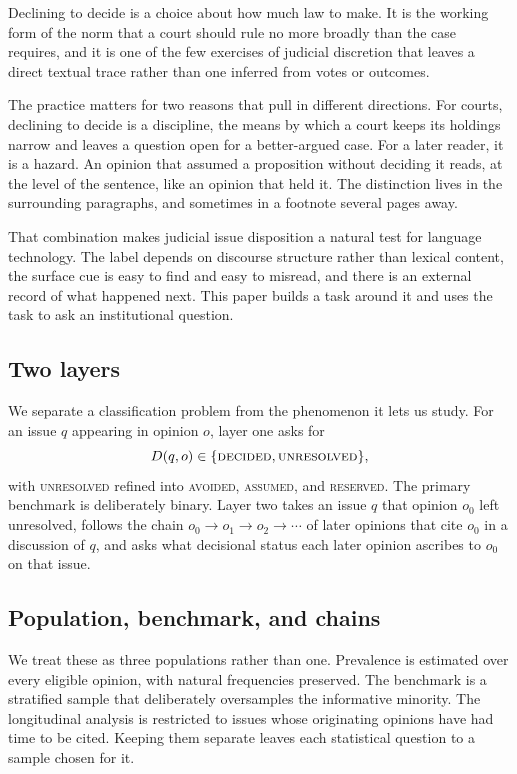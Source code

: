 \documentclass[11pt]{article}
\begin{document}
Declining to decide is a choice about how much law to make. It is the working
form of the norm that a court should rule no more broadly than the case
requires, and it is one of the few exercises of judicial discretion that leaves
a direct textual trace rather than one inferred from votes or outcomes.

The practice matters for two reasons that pull in different directions. For
courts, declining to decide is a discipline, the means by which a court keeps its
holdings narrow and leaves a question open for a better-argued case. For a later
reader, it is a hazard. An opinion that assumed a proposition without deciding it
reads, at the level of the sentence, like an opinion that held it. The
distinction lives in the surrounding paragraphs, and sometimes in a footnote
several pages away.

That combination makes judicial issue disposition a natural test for language
technology. The label depends on discourse structure rather than lexical content,
the surface cue is easy to find and easy to misread, and there is an external
record of what happened next. This paper builds a task around it and uses the
task to ask an institutional question.

\subsection{Two layers} We separate a classification problem from the phenomenon
it lets us study. For an issue $q$ appearing in opinion $o$, layer one asks for
\begin{equation}
D(q,o) \in \{\textsc{decided}, \textsc{unresolved}\},
\end{equation}
with \textsc{unresolved} refined into \textsc{avoided}, \textsc{assumed}, and
\textsc{reserved}. The primary benchmark is deliberately binary. Layer two takes
an issue $q$ that opinion $o_0$ left unresolved, follows the chain
$o_0 \rightarrow o_1 \rightarrow o_2 \rightarrow \cdots$ of later opinions that
cite $o_0$ in a discussion of $q$, and asks what decisional status each later
opinion ascribes to $o_0$ on that issue.

\subsection{Population, benchmark, and chains} We treat these as three
populations rather than one. Prevalence is estimated over every eligible
opinion, with natural frequencies preserved. The benchmark is a stratified
sample that deliberately oversamples the informative minority. The longitudinal
analysis is restricted to issues whose originating opinions have had time to be
cited. Keeping them separate leaves each statistical question to a sample chosen
for it.
\end{document}
